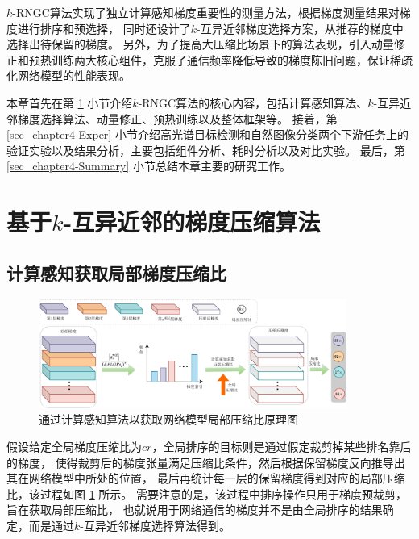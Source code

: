 \documentclass{xdupgthesis}
\begin{document}
$k$-RNGC算法实现了独立计算感知梯度重要性的测量方法，根据梯度测量结果对梯度进行排序和预选择，
同时还设计了$k$-互异近邻梯度选择方案，从推荐的梯度中选择出待保留的梯度。
另外，为了提高大压缩比场景下的算法表现，引入动量修正和预热训练两大核心组件，克服了通信频率降低导致的梯度陈旧问题，保证稀疏化网络模型的性能表现。

本章首先在第 \ref{sec_k-RNGC} 小节介绍$k$-RNGC算法的核心内容，包括计算感知算法、$k$-互异近邻梯度选择算法、动量修正、预热训练以及整体框架等。
接着，第 \ref{sec_chapter4-Exper} 小节介绍高光谱目标检测和自然图像分类两个下游任务上的验证实验以及结果分析，主要包括组件分析、耗时分析以及对比实验。
最后，第 \ref{sec_chapter4-Summary} 小节总结本章主要的研究工作。

\section{基于\texorpdfstring{$k$}.-互异近邻的梯度压缩算法}
\label{sec_k-RNGC}
\subsection{计算感知获取局部梯度压缩比}
\begin{figure}[ht]
    \centering
    \includegraphics[width=0.90\textwidth]{k-RNGC.pdf}
    \caption{通过计算感知算法以获取网络模型局部压缩比原理图}
    \label{fig_k-RNGC-global-rank}
\end{figure}

假设给定全局梯度压缩比为$cr$，全局排序的目标则是通过假定裁剪掉某些排名靠后的梯度，
使得裁剪后的梯度张量满足压缩比条件，然后根据保留梯度反向推导出其在网络模型中所处的位置，
最后再统计每一层的保留梯度得到对应的局部压缩比，该过程如图 \ref{fig_k-RNGC-global-rank} 所示。
需要注意的是，该过程中排序操作只用于梯度预裁剪，旨在获取局部压缩比，
也就说用于网络通信的梯度并不是由全局排序的结果确定，而是通过$k$-互异近邻梯度选择算法得到。
\end{document}
